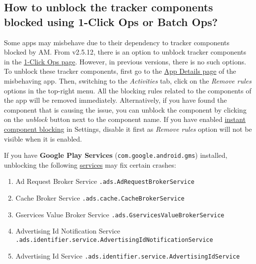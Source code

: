 \subsection{How to unblock the tracker components blocked using 1-Click Ops or Batch Ops?}\label{subsec:faq:how-to-unblock-tracker-components} %
Some apps may misbehave due to their dependency to tracker components blocked by AM. From v2.5.12, there is an option
to unblock tracker components in the \hyperref[sec:1-click-ops-page]{1-Click Ops page}. However, in previous versions,
there is no such options. To unblock these tracker components, first go to the \hyperref[sec:app-details-page]{App
Details page} of the misbehaving app. Then, switching to the \textit{Activities} tab, click on the \textit{Remove rules}
options in the top-right menu. All the blocking rules related to the components of the app will be removed immediately.
Alternatively, if you have found the component that is causing the issue, you can unblock the component by clicking on
the \textit{unblock} button next to the component name. If you have enabled
\hyperref[subsubsec:instant-component-blocking]{instant component blocking} in Settings, disable it first as
\textit{Remove rules} option will not be visible when it is enabled.

If you have \textbf{Google Play Services} (\texttt{com.google.android.gms}) installed, unblocking the following
\hyperref[subsubsec:details:servcies]{services} may fix certain crashes:
\begin{enumerate}
    \item Ad Request Broker Service \small{\texttt{.ads.AdRequestBrokerService}}
    \item Cache Broker Service \small{\texttt{.ads.cache.CacheBrokerService}}
    \item Gservices Value Broker Service \small{\texttt{.ads.GservicesValueBrokerService}}
    \item Advertising Id Notification Service \small{\texttt{.ads.identifier.service.AdvertisingIdNotificationService}}
    \item Advertising Id Service \small{\texttt{.ads.identifier.service.AdvertisingIdService}}
\end{enumerate}
